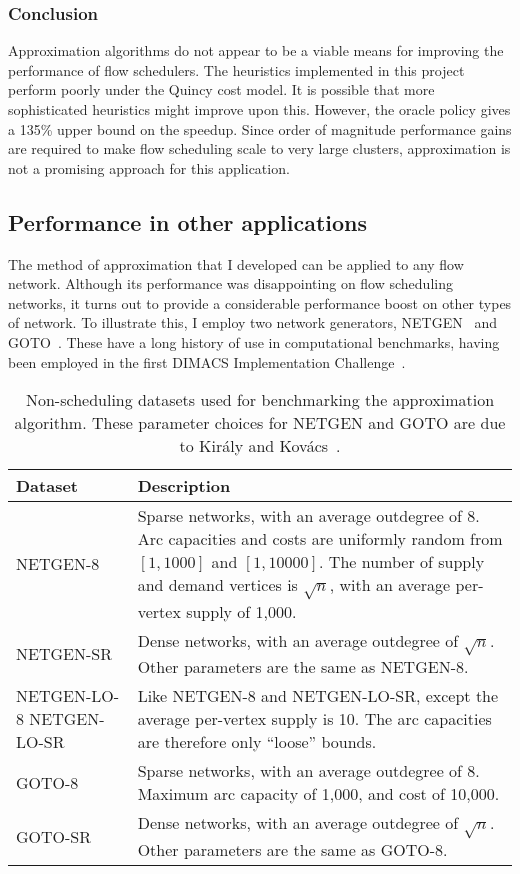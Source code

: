 \subsubsection{Conclusion}

Approximation algorithms do not appear to be a viable means for improving the performance of flow schedulers. The heuristics implemented in this project perform poorly under the Quincy cost model. It is possible that more sophisticated heuristics might improve upon this. However, the oracle policy gives a 135\% upper bound on the speedup. Since order of magnitude performance gains are required to make flow scheduling scale to very large clusters, approximation is not a promising approach for this application.

\subsection{Performance in other applications}

The method of approximation that I developed can be applied to any flow network. Although its performance was disappointing on flow scheduling networks, it turns out to provide a considerable performance boost on other types of network. To illustrate this, I employ two network generators, NETGEN~\cite{Klingman:1974} and GOTO~\cite{GoldbergDIMACS:1993}. These have a long history of use in computational benchmarks, having been employed in the first DIMACS Implementation Challenge~\cite{DIMACSChallenge:Book}.

\begin{table}
    \centering
    \footnotesize
    \begin{tabular}{p{}|p{}}
        \textbf{Dataset} & \textbf{Description} \tabularnewline
        \hline
        NETGEN-8 & Sparse networks, with an average outdegree of $8$. Arc capacities and costs are uniformly random from $\left[1,1000\right]$ and $\left[1,10000\right]$. The number of supply and demand vertices is $\sqrt{n}$, with an average per-vertex supply of 1,000. \tabularnewline
        NETGEN-SR & Dense networks, with an average outdegree of $\sqrt{n}$. Other parameters are the same as NETGEN-8. \tabularnewline
        NETGEN-LO-8 NETGEN-LO-SR & Like NETGEN-8 and NETGEN-LO-SR, except the average per-vertex supply is 10. The arc capacities are therefore only ``loose'' bounds. \tabularnewline
        GOTO-8 & Sparse networks, with an average outdegree of $8$. Maximum arc capacity of 1,000, and cost of 10,000. \tabularnewline
        GOTO-SR & Dense networks, with an average outdegree of $\sqrt{n}$. Other parameters are the same as GOTO-8. \tabularnewline
    \end{tabular}
    \caption[Non-scheduling datasets used for benchmarking the approximation algorithm.]{Non-scheduling datasets used for benchmarking the approximation algorithm. These parameter choices for NETGEN and GOTO are due to Kir{\'{a}}ly and Kov{\'{a}}cs~\cite{KiralyKovacs:2012}.}
    \label{table:general-datasets}
\end{table}

